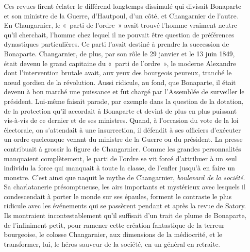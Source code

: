 \documentclass[french,twoside]{book} %
\begin{document}
Ces revues firent éclater le différend longtemps dissimulé qui divisait Bonaparte et son ministre de la Guerre, d’Hautpoul, d’un côté, et Changarnier de l’autre. En Changarnier, le « parti de l’ordre » avait trouvé l’homme vraiment neutre qu’il cherchait, l’homme chez lequel il ne pouvait être question de préférences dynastiques particulières. Ce parti l’avait destiné à prendre la succession de Bonaparte. Changarnier, de plus, par son rôle le 29 janvier et le 13 juin 1849, était devenu le grand capitaine du « parti de l’ordre », le moderne Alexandre dont l’intervention brutale avait, aux yeux des bourgeois peureux, tranché le nœud gordien de la révolution. Aussi ridicule, au fond, que Bonaparte, il était devenu à bon marché une puissance et fut chargé par l’Assemblée de surveiller le président. Lui-même faisait parade, par exemple dans la question de la dotation, de la protection qu’il accordait à Bonaparte et devint de plus en plus puissant vis-à-vis de ce dernier et de ses ministres. Quand, à l’occasion du vote de la loi électorale, on s’attendait à une insurrection, il défendit à ses officiers d’exécuter un ordre quelconque venant du ministre de la Guerre ou du président. La presse contribuait à grossir la figure de Changarnier. Comme les grandes personnalités manquaient complètement, le parti de l’ordre se vit forcé d’attribuer à un seul individu la force qui manquait à toute la classe, de l’enfler jusqu’à en faire un monstre. C’est ainsi que naquit le mythe de Changarnier, \emph{boulevard de la société}. Sa charlatanerie présomptueuse, les airs importants et mystérieux avec lesquels il condescendait à porter le monde sur ses épaules, forment le contraste le plus ridicule avec les événements qui se passèrent pendant et après la revue de Satory. Ils montraient incontestablement qu’il suffisait d’un trait de plume de Bonaparte, de l’infiniment petit, pour ramener cette création fantastique de la terreur bourgeoise, le colosse Changarnier, aux dimensions de la médiocrité, et le transformer, lui, le héros sauveur de la société, en un général en retraite.\par
\end{document}

